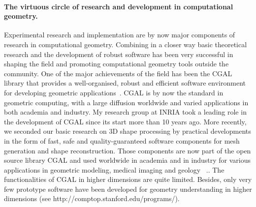 

\paragraph{The  virtuous circle  of research and development in computational geometry.}
Experimental research and implementation are by now major components of research in computational geometry.  
Combining in a closer way basic theoretical research and the development of robust software
has been very successful in shaping the field and promoting computational geometry tools outside the community.
One of the major achievements of the field has been the CGAL library that provides a well-organised, robust and efficient software environment for developing geometric applications~\cite{cgal}. CGAL is by now the standard in geometric computing, with a large diffusion worldwide and varied applications in both academia and industry.  My research group at INRIA took a leading role in the development of CGAL since its start more than 10 years ago. More recently, we seconded our basic research on 3D shape processing by practical developments in the form of fast, safe and quality-guaranteed software components for mesh generation and shape reconstruction.  Those components  are now part of the open source library CGAL  and used worldwide in academia and in industry for various applications in geometric modeling, medical imaging and geology ~\cite{cgal:rty-m3-11}.. The functionalities of CGAL in higher dimensions are quite limited. Besides, only very few prototype software have been developed for geometry understanding in higher dimensions (see http://comptop.stanford.edu/programs/).

